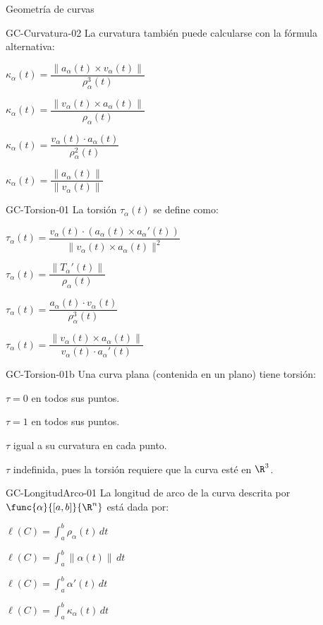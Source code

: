 \documentclass[a4,11pt]{aleph-notas}
\begin{document}
\begin{quiz}{Geometría de curvas}
\begin{multi}[]%
    {GC-Curvatura-02}
    La curvatura también puede calcularse con la fórmula alternativa:
    \item* $\kappa_\alpha(t)=\dfrac{\|a_\alpha(t)\times v_\alpha(t)\|}{\rho^3_\alpha(t)}$
    \item $\kappa_\alpha(t)=\dfrac{\|v_\alpha(t)\times a_\alpha(t)\|}{\rho_\alpha(t)}$
    \item $\kappa_\alpha(t)=\dfrac{v_\alpha(t)\cdot a_\alpha(t)}{\rho^2_\alpha(t)}$
    \item $\kappa_\alpha(t)=\dfrac{\|a_\alpha(t)\|}{\|v_\alpha(t)\|}$
\end{multi}

\begin{multi}[]%
    {GC-Torsion-01}
    La torsión $\tau_\alpha(t)$ se define como:
    \item* $\tau_\alpha(t)=\dfrac{v_\alpha(t)\cdot\left(a_\alpha(t)\times a_\alpha'(t)\right)}{\|v_\alpha(t)\times a_\alpha(t)\|^2}$
    \item $\tau_\alpha(t)=\dfrac{\|T_\alpha'(t)\|}{\rho_\alpha(t)}$
    \item $\tau_\alpha(t)=\dfrac{a_\alpha(t)\cdot v_\alpha(t)}{\rho^3_\alpha(t)}$
    \item $\tau_\alpha(t)=\dfrac{\|v_\alpha(t)\times a_\alpha(t)\|}{v_\alpha(t)\cdot a_\alpha'(t)}$
\end{multi}

\begin{multi}[]%
    {GC-Torsion-01b}
    Una curva plana (contenida en un plano) tiene torsión:
    \item* $\tau=0$ en todos sus puntos.
    \item $\tau=1$ en todos sus puntos.
    \item $\tau$ igual a su curvatura en cada punto.
    \item $\tau$ indefinida, pues la torsión requiere que la curva esté en $\R^3$.
\end{multi}

\begin{multi}[]%
    {GC-LongitudArco-01}
    La longitud de arco de la curva descrita por $\func{\alpha}{[a,b]}{\R^n}$ está dada por:
    \item* $\ell(C)=\displaystyle\int_a^b \rho_\alpha(t)\,dt$
    \item $\ell(C)=\displaystyle\int_a^b \|\alpha(t)\|\,dt$
    \item $\ell(C)=\displaystyle\int_a^b \alpha'(t)\,dt$
    \item $\ell(C)=\displaystyle\int_a^b \kappa_\alpha(t)\,dt$
\end{multi}

\end{quiz}
\end{document}
